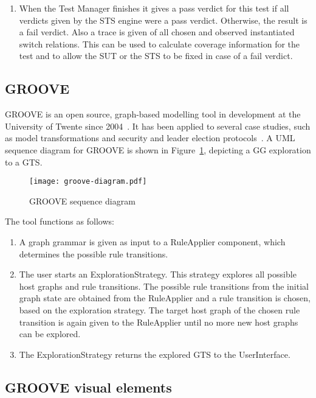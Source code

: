 \begin{enumerate}
  \item When the Test Manager finishes it gives a pass verdict for this test if all verdicts given by the STS engine were a pass verdict. Otherwise, the result is a fail verdict. Also a trace is given of all chosen and observed instantiated switch relations. This can be used to calculate coverage information for the test and to allow the SUT or the STS to be fixed in case of a fail verdict.
\end{enumerate}

\subsection{GROOVE}\label{sec:descriptiongroove}
GROOVE is an open source, graph-based modelling tool in development at the University of Twente since 2004~\cite{Rensink:GROOVE}. It has been applied to several case studies, such as model transformations and security and leader election protocols~\cite{Ghamarian:GROOVE}. A UML sequence diagram for GROOVE is shown in Figure~\ref{fig:groove_tool}, depicting a GG exploration to a GTS.

\begin{figure}[h]
  \begin{center}
    \texttt{[image: groove-diagram.pdf]}
  \end{center}
  \caption{GROOVE sequence diagram}
  \label{fig:groove_tool}
\end{figure}

The tool functions as follows:
\begin{enumerate}
\item A graph grammar is given as input to a RuleApplier component, which determines the possible rule transitions.
\item The user starts an ExplorationStrategy. This strategy explores all possible host graphs and rule transitions. The possible rule transitions from the initial graph state are obtained from the RuleApplier and a rule transition is chosen, based on the exploration strategy. The target host graph of the chosen rule transition is again given to the RuleApplier until no more new host graphs can be explored.
\item The ExplorationStrategy returns the explored GTS to the UserInterface.
\end{enumerate}

\subsection{GROOVE visual elements}
